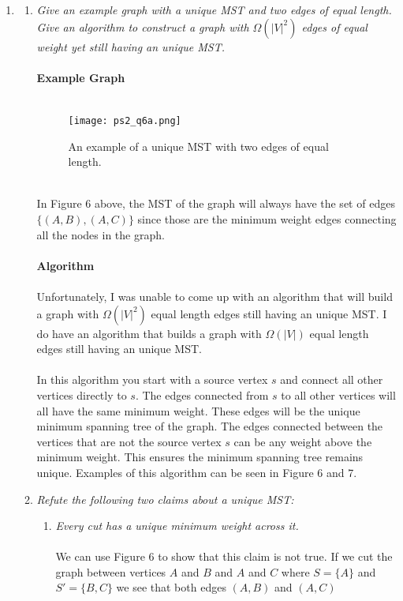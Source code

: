 \documentclass[12pt]{article}
\begin{document}
\begin{enumerate}
		\item
			\begin{enumerate}
				\item \textit{Give an example graph with a unique MST and two edges of equal length.  Give an algorithm to construct a graph with $\Omega{(|V|^2)}$
				edges of equal weight yet still having an unique MST.}\\
				\\
				\textbf{Example Graph}\\
				\\
				\begin{figure}[h]
				\caption{An example of a unique MST with two edges of equal length.}
				\texttt{[image: ps2\_q6a.png]}
				\centering
				\end{figure}
				\\
				In Figure 6 above, the MST of the graph will always have the set of edges $\{(A,B),(A,C)\}$ since those are the minimum weight edges connecting all the nodes in the graph.\\
				\\
				\textbf{Algorithm}\\
				\\
				Unfortunately, I was unable to come up with an algorithm that will build a graph with $\Omega{(|V|^2)}$ equal length edges still having an unique MST. 
				I do have an algorithm that builds a graph with $\Omega{(|V|)}$ equal length edges still having an unique MST.\\
				\\
				In this algorithm you start with a source vertex $s$ and connect all other vertices directly to $s$.  The edges connected from $s$ to all other vertices will all have the same minimum weight.
				These edges will be the unique minimum spanning tree of the graph.
				The edges connected between the vertices that are not the source vertex $s$ can be any weight above the minimum weight.  This ensures the minimum spanning tree remains unique.
				Examples of this algorithm can be seen in Figure 6 and 7.
				\\
				\item \textit{Refute the following two claims about a unique MST:}
					\begin{enumerate}
						\item \textit{Every cut has a unique minimum weight across it.}\\
						\\
						We can use Figure 6 to show that this claim is not true.  
						If we cut the graph between vertices $A$ and $B$ and $A$ and $C$ where $S = \{A\}$ and $S' =\{B,C\}$ we see that both edges $(A,B)$ and $(A,C)$

\end{enumerate}
\end{enumerate}
\end{enumerate}
\end{document}
